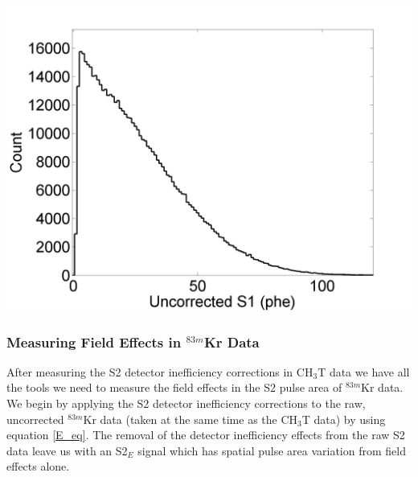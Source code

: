 \documentclass[a4paper,12pt]{article}
\begin{document}
{\begin{center}
\includegraphics[scale=0.5]{Run04Corrections/CH3T_S1_Threshold.png}
\label{fig:S1thresholded}
\end{center}

 
\subsubsection{Measuring Field Effects in $^{83m}$Kr Data} \label{section:FieldEffects}

After measuring the S2 detector inefficiency corrections in CH$_3$T data we have all the tools we need to measure the field effects in the S2 pulse area of $^{83m}$Kr data.  We begin by applying the S2 detector inefficiency corrections to the raw,  uncorrected $^{83m}$Kr data (taken at the same time as the CH$_3$T data) by using equation \ref{E_eq}.  The removal of the detector inefficiency effects from the raw S2 data leave us with an S2$_E$ signal which has spatial pulse area variation from field effects alone.

}
\end{document}
